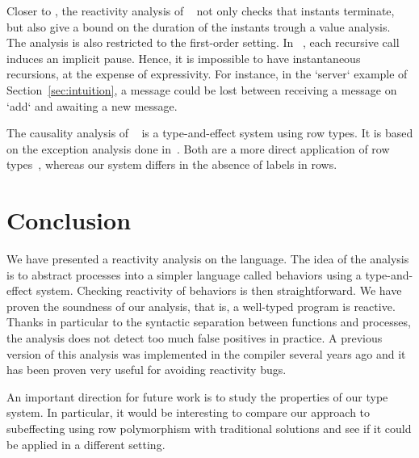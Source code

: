 \documentclass[9pt]{sigplanconf}
\begin{document}
Closer to \rml, the reactivity analysis of \funloft~\cite{Amadio:2007b} not only checks that instants terminate, but also give a bound on the duration of the instants trough a value analysis. The analysis is also restricted to the first-order setting. In \ulm~\cite{Boudol:2004}, each recursive call induces an implicit pause. Hence, it is impossible to have instantaneous recursions, at the expense of expressivity. For instance, in the `server` example of Section~\ref{sec:intuition}, a message could be lost between receiving a message on `add` and awaiting a new message.

The causality analysis of \lucy~\cite{Cuoq:2001} is a type-and-effect system using row types. It is based on the exception analysis done in~\cite{Leroy:2000}. Both are a more direct application of row types~\cite{Remy:1993}, whereas our system differs in the absence of labels in rows.

\section{Conclusion}

We have presented a reactivity analysis on the \rml language. The idea of the analysis is to abstract processes into a simpler language called behaviors using a type-and-effect system. Checking reactivity of behaviors is then straightforward. We have proven the soundness of our analysis, that is, a well-typed program is reactive. Thanks in particular to the syntactic separation between functions and processes, the analysis does not detect too much false positives in practice. A previous version of this analysis was implemented in the \rml compiler several years ago and it has been proven very useful for avoiding reactivity bugs. 

An important direction for future work is to study the properties of our type system. In particular, it would be interesting to compare our approach to subeffecting using row polymorphism with traditional solutions and see if it could be applied in a different setting.
%
%



\begin{small}

\end{small}

\end{document}
